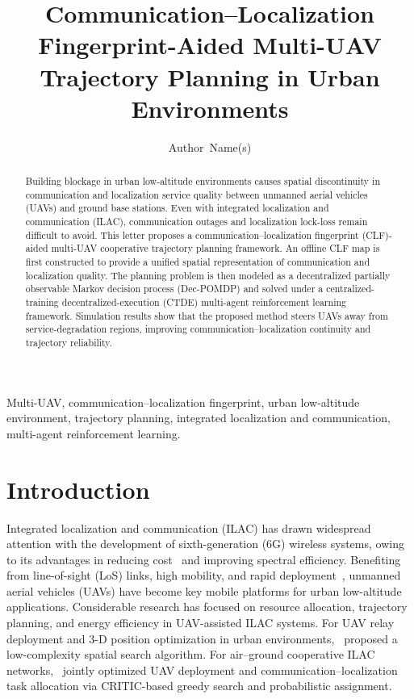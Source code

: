 \documentclass[lettersize,journal]{IEEEtran}
\begin{document}
\title{Communication--Localization Fingerprint-Aided Multi-UAV Trajectory Planning in Urban Environments}

\author{Author~Name(s)}

\maketitle

\begin{abstract}
Building blockage in urban low-altitude environments causes spatial discontinuity in communication and localization service quality between unmanned aerial vehicles (UAVs) and ground base stations. Even with integrated localization and communication (ILAC), communication outages and localization lock-loss remain difficult to avoid. This letter proposes a communication--localization fingerprint (CLF)-aided multi-UAV cooperative trajectory planning framework. An offline CLF map is first constructed to provide a unified spatial representation of communication and localization quality. The planning problem is then modeled as a decentralized partially observable Markov decision process (Dec-POMDP) and solved under a centralized-training decentralized-execution (CTDE) multi-agent reinforcement learning framework. Simulation results show that the proposed method steers UAVs away from service-degradation regions, improving communication--localization continuity and trajectory reliability.
\end{abstract}

\begin{IEEEkeywords}
Multi-UAV, communication--localization fingerprint, urban low-altitude environment, trajectory planning, integrated localization and communication, multi-agent reinforcement learning.
\end{IEEEkeywords}

\section{Introduction}

Integrated localization and communication (ILAC) has drawn widespread attention with the development of sixth-generation (6G) wireless systems, owing to its advantages in reducing cost~\cite{ref1} and improving spectral efficiency. Benefiting from line-of-sight (LoS) links, high mobility, and rapid deployment~\cite{ref2,ref3,ref4,ref5,ref6}, unmanned aerial vehicles (UAVs) have become key mobile platforms for urban low-altitude applications. Considerable research has focused on resource allocation, trajectory planning, and energy efficiency in UAV-assisted ILAC systems. For UAV relay deployment and 3-D position optimization in urban environments,~\cite{ref7} proposed a low-complexity spatial search algorithm. For air--ground cooperative ILAC networks,~\cite{ref8} jointly optimized UAV deployment and communication--localization task allocation via CRITIC-based greedy search and probabilistic assignment.
\end{document}
